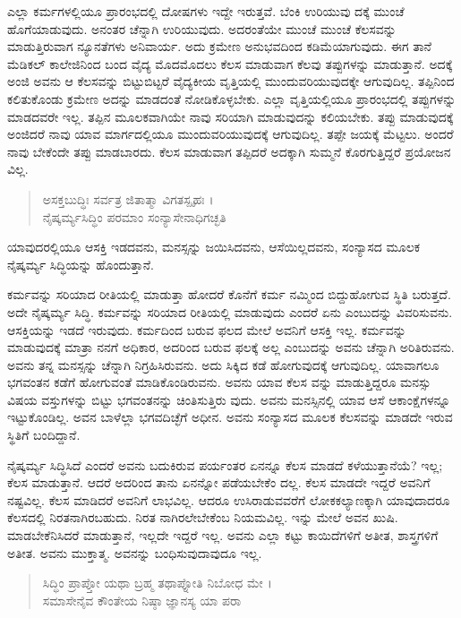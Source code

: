 ಎಲ್ಲಾ ಕರ್ಮಗಳಲ್ಲಿಯೂ ಪ್ರಾರಂಭದಲ್ಲಿ ದೋಷಗಳು ಇದ್ದೇ ಇರುತ್ತವೆ. ಬೆಂಕಿ ಉರಿಯುವು ದಕ್ಕೆ ಮುಂಚೆ ಹೊಗೆಯಾಡುವುದು. ಅನಂತರ ಚೆನ್ನಾಗಿ ಉರಿಯುವುದು. ಅದರಂತೆಯೇ ಮುಂಚೆ ಮುಂಚೆ ಕೆಲಸವನ್ನು ಮಾಡುತ್ತಿರುವಾಗ ನ್ಯೂನತೆಗಳು ಅನಿವಾರ್ಯ. ಅದು ಕ್ರಮೇಣ ಅನುಭವದಿಂದ ಕಡಿಮೆಯಾಗುವುದು. ಈಗ ತಾನೆ ಮೆಡಿಕಲ್ ಕಾಲೇಜಿನಿಂದ ಬಂದ ವೈದ್ಯ ಮೊದಮೊದಲು ಕೆಲಸ ಮಾಡುವಾಗ ಕೆಲವು ತಪ್ಪುಗಳನ್ನು ಮಾಡುತ್ತಾನೆ. ಅದಕ್ಕೆ ಅಂಜಿ ಅವನು ಆ ಕೆಲಸವನ್ನು ಬಿಟ್ಟುಬಿಟ್ಟರೆ ವೈದ್ಯಕೀಯ ವೃತ್ತಿಯಲ್ಲಿ ಮುಂದುವರಿಯುವುದಕ್ಕೇ ಆಗುವುದಿಲ್ಲ. ತಪ್ಪಿನಿಂದ ಕಲಿತುಕೊಂಡು ಕ್ರಮೇಣ ಅದನ್ನು ಮಾಡದಂತೆ ನೋಡಿಕೊಳ್ಳಬೇಕು. ಎಲ್ಲಾ ವೃತ್ತಿಯಲ್ಲಿಯೂ ಪ್ರಾರಂಭದಲ್ಲಿ ತಪ್ಪುಗಳನ್ನು ಮಾಡದವರೇ ಇಲ್ಲ. ತಪ್ಪಿನ ಮೂಲಕವಾಗಿಯೇ ನಾವು ಸರಿಯಾಗಿ ಮಾಡುವುದನ್ನು ಕಲಿಯಬೇಕು. ತಪ್ಪು ಮಾಡುವುದಕ್ಕೆ ಅಂಜಿದರೆ ನಾವು ಯಾವ ಮಾರ್ಗದಲ್ಲಿಯೂ ಮುಂದುವರಿಯುವುದಕ್ಕೆ ಆಗುವುದಿಲ್ಲ. ತಪ್ಪೇ ಜಯಕ್ಕೆ ಮೆಟ್ಟಲು. ಅಂದರೆ ನಾವು ಬೇಕೆಂದೇ ತಪ್ಪು ಮಾಡಬಾರದು. ಕೆಲಸ ಮಾಡುವಾಗ ತಪ್ಪಿದರೆ ಅದಕ್ಕಾಗಿ ಸುಮ್ಮನೆ ಕೊರಗುತ್ತಿದ್ದರೆ ಪ್ರಯೋಜನ ವಿಲ್ಲ.

\begin{verse}
ಅಸಕ್ತಬುದ್ಧಿಃ ಸರ್ವತ್ರ ಜಿತಾತ್ಮಾ ವಿಗತಸ್ಪೃಹಃ ।\\ನೈಷ್ಕರ್ಮ್ಯಸಿದ್ಧಿಂ ಪರಮಾಂ ಸಂನ್ಯಾಸೇನಾಧಿಗಚ್ಛತಿ 
\end{verse}

{\small ಯಾವುದರಲ್ಲಿಯೂ ಆಸಕ್ತಿ ಇಡದವನು, ಮನಸ್ಸನ್ನು ಜಯಿಸಿದವನು, ಆಸೆಯಿಲ್ಲದವನು, ಸಂನ್ಯಾಸದ ಮೂಲಕ ನೈಷ್ಕರ್ಮ್ಯ ಸಿದ್ಧಿಯನ್ನು ಹೊಂದುತ್ತಾನೆ.}

ಕರ್ಮವನ್ನು ಸರಿಯಾದ ರೀತಿಯಲ್ಲಿ ಮಾಡುತ್ತಾ ಹೋದರೆ ಕೊನೆಗೆ ಕರ್ಮ ನಮ್ಮಿಂದ ಬಿದ್ದುಹೋಗುವ ಸ್ಥಿತಿ ಬರುತ್ತದೆ. ಅದೇ ನೈಷ್ಕರ್ಮ್ಯ ಸಿದ್ಧಿ. ಕರ್ಮವನ್ನು ಸರಿಯಾದ ರೀತಿಯಲ್ಲಿ ಮಾಡುವುದು ಎಂದರೆ ಏನು ಎಂಬುದನ್ನು ವಿವರಿಸುವನು. ಆಸಕ್ತಿಯನ್ನು ಇಡದೆ ಇರುವುದು. ಕರ್ಮದಿಂದ ಬರುವ ಫಲದ ಮೇಲೆ ಅವನಿಗೆ ಆಸಕ್ತಿ ಇಲ್ಲ. ಕರ್ಮವನ್ನು ಮಾಡುವುದಕ್ಕೆ ಮಾತ್ರಾ ನನಗೆ ಅಧಿಕಾರ, ಅದರಿಂದ ಬರುವ ಫಲಕ್ಕೆ ಅಲ್ಲ ಎಂಬುದನ್ನು ಅವನು ಚೆನ್ನಾಗಿ ಅರಿತಿರುವನು. ಅವನು ತನ್ನ ಮನಸ್ಸನ್ನು ಚೆನ್ನಾಗಿ ನಿಗ್ರಹಿಸಿರುವನು. ಅದು ಸಿಕ್ಕಿದ ಕಡೆ ಹೋಗುವುದಕ್ಕೆ ಆಗುವುದಿಲ್ಲ. ಯಾವಾಗಲೂ ಭಗವಂತನ ಕಡೆಗೆ ಹೋಗುವಂತೆ ಮಾಡಿಕೊಂಡಿರುವನು. ಅವನು ಯಾವ ಕೆಲಸ ವನ್ನು ಮಾಡುತ್ತಿದ್ದರೂ ಮನಸ್ಸು ವಿಷಯ ವಸ್ತುಗಳನ್ನು ಬಿಟ್ಟು ಭಗವಂತನನ್ನು ಚಿಂತಿಸುತ್ತಿರು ವುದು. ಅವನು ಮನಸ್ಸಿನಲ್ಲಿ ಯಾವ ಆಸೆ ಆಕಾಂಕ್ಷೆಗಳನ್ನೂ ಇಟ್ಟುಕೊಂಡಿಲ್ಲ. ಅವನ ಬಾಳೆಲ್ಲಾ ಭಗವದಿಚ್ಛೆಗೆ ಅಧೀನ. ಅವನು ಸಂನ್ಯಾಸದ ಮೂಲಕ ಕೆಲಸವನ್ನು ಮಾಡದೇ ಇರುವ ಸ್ಥಿತಿಗೆ ಬಂದಿದ್ದಾನೆ.

ನೈಷ್ಕರ್ಮ್ಯ ಸಿದ್ಧಿಸಿದೆ ಎಂದರೆ ಅವನು ಬದುಕಿರುವ ಪರ್ಯಂತರ ಏನನ್ನೂ ಕೆಲಸ ಮಾಡದೆ ಕಳೆಯುತ್ತಾನೆಯೆ? ಇಲ್ಲ; ಕೆಲಸ ಮಾಡುತ್ತಾನೆ. ಆದರೆ ಅದರಿಂದ ತಾನು ಏನನ್ನೋ ಪಡೆಯಬೇಕೆಂ ದಲ್ಲ. ಕೆಲಸ ಮಾಡದೇ ಇದ್ದರೆ ಅವನಿಗೆ ನಷ್ಟವಿಲ್ಲ. ಕೆಲಸ ಮಾಡಿದರೆ ಅವನಿಗೆ ಲಾಭವಿಲ್ಲ. ಆದರೂ ಉಸಿರಾಡುವವರೆಗೆ ಲೋಕಕಲ್ಯಾಣಕ್ಕಾಗಿ ಯಾವುದಾದರೂ ಕೆಲಸದಲ್ಲಿ ನಿರತನಾಗಿರಬಹುದು. ನಿರತ ನಾಗಿರಲೇಬೇಕೆಂಬ ನಿಯಮವಿಲ್ಲ. ಇನ್ನು ಮೇಲೆ ಅವನ ಖುಷಿ. ಮಾಡಬೇಕೆನಿಸಿದರೆ ಮಾಡುತ್ತಾನೆ, ಇಲ್ಲದೇ ಇದ್ದರೆ ಇಲ್ಲ. ಅವನು ಎಲ್ಲಾ ಕಟ್ಟು ಕಾಯಿದೆಗಳಿಗೆ ಅತೀತ, ಶಾಸ್ತ್ರಗಳಿಗೆ ಅತೀತ. ಅವನು ಮುಕ್ತಾತ್ಮ. ಅವನನ್ನು ಬಂಧಿಸುವುದಾವುದೂ ಇಲ್ಲ.

\begin{verse}
ಸಿದ್ಧಿಂ ಪ್ರಾಪ್ತೋ ಯಥಾ ಬ್ರಹ್ಮ ತಥಾಪ್ನೋತಿ ನಿಬೋಧ ಮೇ ।\\ಸಮಾಸೇನೈವ ಕೌಂತೇಯ ನಿಷ್ಠಾ ಜ್ಞಾನಸ್ಯ ಯಾ ಪರಾ 
\end{verse}

